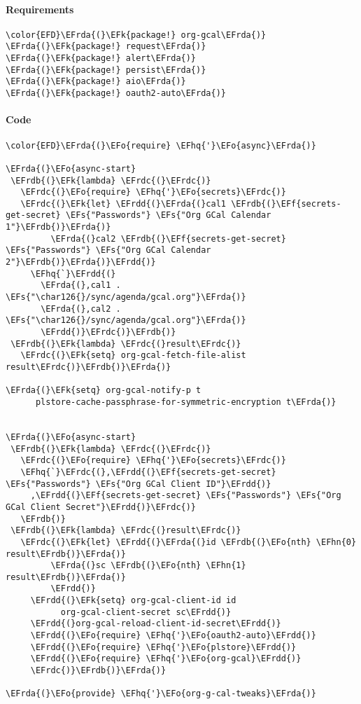 \documentclass[a4wide,10pt]{article}
\newcommand{\EFs}[1]{\textcolor{EFs}{#1}} %
\newcommand{\EFk}[1]{\textcolor{EFk}{#1}} %
\newcommand{\EFf}[1]{\textcolor{EFf}{#1}} %
\newcommand{\EFo}[1]{\textcolor{EFo}{#1}} %
\newcommand{\EFhn}[1]{\textcolor{EFhn}{\textbf{#1}}} %
\newcommand{\EFhq}[1]{\textcolor{EFhq}{#1}} %
\newcommand{\EFrda}[1]{\textcolor{EFrda}{#1}} %
\newcommand{\EFrdb}[1]{\textcolor{EFrdb}{#1}} %
\newcommand{\EFrdc}[1]{\textcolor{EFrdc}{#1}} %
\newcommand{\EFrdd}[1]{\textcolor{EFrdd}{#1}} %
\begin{document}
\paragraph{Requirements}
\label{sec:org088638c}
\begin{Code}
\begin{Verbatim}
\color{EFD}\EFrda{(}\EFk{package!} org-gcal\EFrda{)}
\EFrda{(}\EFk{package!} request\EFrda{)}
\EFrda{(}\EFk{package!} alert\EFrda{)}
\EFrda{(}\EFk{package!} persist\EFrda{)}
\EFrda{(}\EFk{package!} aio\EFrda{)}
\EFrda{(}\EFk{package!} oauth2-auto\EFrda{)}
\end{Verbatim}
\end{Code}
\paragraph{Code}
\label{sec:org84f01ff}
\begin{Code}
\begin{Verbatim}
\color{EFD}\EFrda{(}\EFo{require} \EFhq{'}\EFo{async}\EFrda{)}

\EFrda{(}\EFo{async-start}
 \EFrdb{(}\EFk{lambda} \EFrdc{(}\EFrdc{)}
   \EFrdc{(}\EFo{require} \EFhq{'}\EFo{secrets}\EFrdc{)}
   \EFrdc{(}\EFk{let} \EFrdd{(}\EFrda{(}cal1 \EFrdb{(}\EFf{secrets-get-secret} \EFs{"Passwords"} \EFs{"Org GCal Calendar 1"}\EFrdb{)}\EFrda{)}
         \EFrda{(}cal2 \EFrdb{(}\EFf{secrets-get-secret} \EFs{"Passwords"} \EFs{"Org GCal Calendar 2"}\EFrdb{)}\EFrda{)}\EFrdd{)}
     \EFhq{`}\EFrdd{(}
       \EFrda{(},cal1 .  \EFs{"\char126{}/sync/agenda/gcal.org"}\EFrda{)}
       \EFrda{(},cal2 .  \EFs{"\char126{}/sync/agenda/gcal.org"}\EFrda{)}
       \EFrdd{)}\EFrdc{)}\EFrdb{)}
 \EFrdb{(}\EFk{lambda} \EFrdc{(}result\EFrdc{)}
   \EFrdc{(}\EFk{setq} org-gcal-fetch-file-alist result\EFrdc{)}\EFrdb{)}\EFrda{)}

\EFrda{(}\EFk{setq} org-gcal-notify-p t
      plstore-cache-passphrase-for-symmetric-encryption t\EFrda{)}


\EFrda{(}\EFo{async-start}
 \EFrdb{(}\EFk{lambda} \EFrdc{(}\EFrdc{)}
   \EFrdc{(}\EFo{require} \EFhq{'}\EFo{secrets}\EFrdc{)}
   \EFhq{`}\EFrdc{(},\EFrdd{(}\EFf{secrets-get-secret} \EFs{"Passwords"} \EFs{"Org GCal Client ID"}\EFrdd{)}
     ,\EFrdd{(}\EFf{secrets-get-secret} \EFs{"Passwords"} \EFs{"Org GCal Client Secret"}\EFrdd{)}\EFrdc{)}
   \EFrdb{)}
 \EFrdb{(}\EFk{lambda} \EFrdc{(}result\EFrdc{)}
   \EFrdc{(}\EFk{let} \EFrdd{(}\EFrda{(}id \EFrdb{(}\EFo{nth} \EFhn{0} result\EFrdb{)}\EFrda{)}
         \EFrda{(}sc \EFrdb{(}\EFo{nth} \EFhn{1} result\EFrdb{)}\EFrda{)}
         \EFrdd{)}
     \EFrdd{(}\EFk{setq} org-gcal-client-id id
           org-gcal-client-secret sc\EFrdd{)}
     \EFrdd{(}org-gcal-reload-client-id-secret\EFrdd{)}
     \EFrdd{(}\EFo{require} \EFhq{'}\EFo{oauth2-auto}\EFrdd{)}
     \EFrdd{(}\EFo{require} \EFhq{'}\EFo{plstore}\EFrdd{)}
     \EFrdd{(}\EFo{require} \EFhq{'}\EFo{org-gcal}\EFrdd{)}
     \EFrdc{)}\EFrdb{)}\EFrda{)}

\EFrda{(}\EFo{provide} \EFhq{'}\EFo{org-g-cal-tweaks}\EFrda{)}
\end{Verbatim}
\end{Code}
\end{document}
